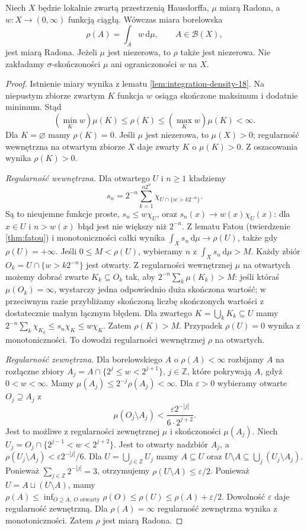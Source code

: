 \begin{lemat}
\label{lem:radon-positive-weight-20}
Niech $X$ będzie lokalnie zwartą przestrzenią Hausdorffa,
$\mu$ miarą Radona, a $w:X\to(0,\infty)$ funkcją ciągłą.
Wówczas miara borelowska
\[
 \rho(A)=\int_A w\,\mathrm d\mu,
 \qquad A\in\mathcal B(X),
\]
jest miarą Radona. Jeżeli $\mu$ jest niezerowa,
to $\rho$ także jest niezerowa. Nie zakładamy
$\sigma$-skończoności $\mu$ ani ograniczoności $w$ na $X$.
\end{lemat}
\begin{proof}
Istnienie miary wynika z lematu
\ref{lem:integration-density-18}.
Na niepustym zbiorze zwartym $K$ funkcja $w$
osiąga skończone maksimum i dodatnie minimum.
Stąd
\[
 (\min_K w)\mu(K)\le\rho(K)\le(\max_K w)\mu(K)<\infty.
\]
Dla $K=\varnothing$ mamy $\rho(K)=0$.
Jeśli $\mu$ jest niezerowa, to $\mu(X)>0$;
regularność wewnętrzna na otwartym zbiorze $X$
daje zwarty $K$ o $\mu(K)>0$. Z oszacowania
wynika $\rho(K)>0$.

\emph{Regularność wewnętrzna.}
Dla otwartego $U$ i $n\ge1$ kładziemy
\[
 s_n=2^{-n}\sum_{k=1}^{n2^n}
             \chi_{U\cap\{w>k2^{-n}\}}.
\]
Są to nieujemne funkcje proste, $s_n\le w\chi_U$,
oraz $s_n(x)\to w(x)\chi_U(x)$: dla $x\in U$
i $n>w(x)$ błąd jest nie większy niż $2^{-n}$.
Z lematu Fatou (twierdzenie \ref{thm:fatou})
i monotoniczności całki wynika
$\int_X s_n\,\mathrm d\mu\to\rho(U)$, także
gdy $\rho(U)=+\infty$.
Jeśli $0\le M<\rho(U)$, wybieramy $n$ z
$\int_X s_n\,\mathrm d\mu>M$. Każdy zbiór
$O_k=U\cap\{w>k2^{-n}\}$ jest otwarty.
Z regularności wewnętrznej $\mu$ na otwartych
możemy dobrać zwarte $K_k\subseteq O_k$ tak, aby
$2^{-n}\sum_k\mu(K_k)>M$: jeśli któraś
$\mu(O_k)=\infty$, wystarczy jedna odpowiednio
duża skończona wartość; w przeciwnym razie
przybliżamy skończoną liczbę skończonych wartości
z dostatecznie małym łącznym błędem.
Dla zwartego $K=\bigcup_kK_k\subseteq U$ mamy
$2^{-n}\sum_k\chi_{K_k}\le s_n\chi_K\le w\chi_K$.
Zatem $\rho(K)>M$. Przypadek $\rho(U)=0$
wynika z monotoniczności. To dowodzi regularności
wewnętrznej $\rho$ na otwartych.

\emph{Regularność zewnętrzna.}
Dla borelowskiego $A$ o $\rho(A)<\infty$ rozbijamy
$A$ na rozłączne zbiory
$A_j=A\cap\{2^j\le w<2^{j+1}\}$, $j\in\mathbb Z$,
które pokrywają $A$, gdyż $0<w<\infty$.
Mamy $\mu(A_j)\le2^{-j}\rho(A_j)<\infty$.
Dla $\varepsilon>0$ wybieramy otwarte $O_j\supseteq A_j$
z
\[
 \mu(O_j\setminus A_j)
 <\frac{\varepsilon 2^{-|j|}}{6\cdot2^{j+2}}.
\]
Jest to możliwe z regularności zewnętrznej $\mu$
i skończoności $\mu(A_j)$.
Niech $U_j=O_j\cap\{2^{j-1}<w<2^{j+2}\}$.
Jest to otwarty nadzbiór $A_j$, a
$\rho(U_j\setminus A_j)<\varepsilon2^{-|j|}/6$.
Dla $U=\bigcup_{j\in\mathbb Z}U_j$ mamy $A\subseteq U$
oraz $U\setminus A\subseteq\bigcup_j(U_j\setminus A_j)$.
Ponieważ $\sum_{j\in\mathbb Z}2^{-|j|}=3$,
otrzymujemy $\rho(U\setminus A)\le\varepsilon/2$.
Ponieważ $U=A\sqcup(U\setminus A)$, mamy
$\rho(A)\le\inf_{O\supseteq A,\ O\text{ otwarty}}\rho(O)
\le\rho(U)\le\rho(A)+\varepsilon/2$.
Dowolność $\varepsilon$ daje regularność zewnętrzną.
Dla $\rho(A)=\infty$ regularność zewnętrzna wynika
z monotoniczności. Zatem $\rho$ jest miarą Radona.
\end{proof}

